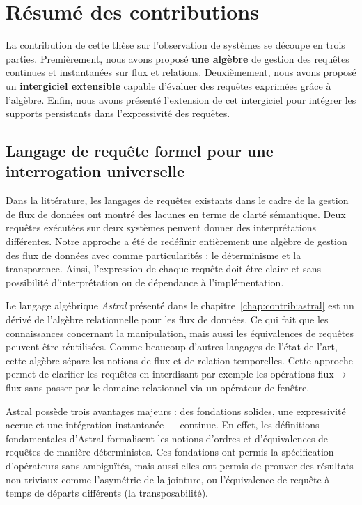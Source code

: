 \section{Résumé des contributions}\label{sec:conclusion:contributions}
La contribution de cette thèse sur l'observation de systèmes se découpe en trois parties. Premièrement, nous avons proposé \textbf{une algèbre} de gestion des requêtes continues et instantanées sur flux et relations. Deuxièmement, nous avons proposé un \textbf{intergiciel extensible} capable d'évaluer des requêtes exprimées grâce à l'algèbre. Enfin, nous avons présenté l'extension de cet intergiciel pour intégrer les supports persistants dans l'expressivité des requêtes.

\subsection{Langage de requête formel pour une interrogation universelle}
Dans la littérature, les langages de requêtes existants dans le cadre de la gestion de flux de données ont montré des lacunes en terme de clarté sémantique. Deux requêtes exécutées sur deux systèmes peuvent donner des interprétations différentes. Notre approche a été de redéfinir entièrement une algèbre de gestion des flux de données avec comme particularités : le déterminisme et la transparence. Ainsi, l'expression de chaque requête doit être claire et sans possibilité d'interprétation ou de dépendance à l'implémentation.

Le langage algébrique \textit{Astral} présenté dans le chapitre~\ref{chap:contrib:astral} est un dérivé de l'algèbre relationnelle pour les flux de données. Ce qui fait que les connaissances concernant la manipulation, mais aussi les équivalences de requêtes peuvent être réutilisées. Comme beaucoup d'autres langages de l'état de l'art, cette algèbre sépare les notions de flux et de relation temporelles. Cette approche permet de clarifier les requêtes en interdisant par exemple les opérations flux$\to$flux sans passer par le domaine relationnel via un opérateur de fenêtre.

Astral possède trois avantages majeurs : des fondations solides, une expressivité accrue et une intégration instantanée — continue. En effet, les définitions fondamentales d'Astral formalisent les notions d'ordres et d'équivalences de requêtes de manière déterministes. Ces fondations ont permis la spécification d'opérateurs sans ambiguïtés, mais aussi elles ont permis de prouver des résultats non triviaux comme l'asymétrie de la jointure, ou l'équivalence de requête à temps de départs différents (la transposabilité).

